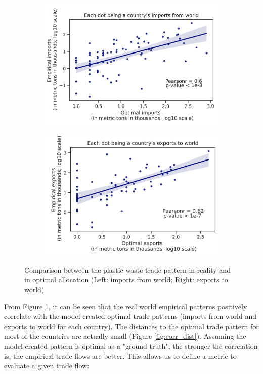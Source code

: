 \documentclass[dvipsnames]{article}
\begin{document}
\begin{figure}[htb!]
	\centering
	\begin{subfigure}{0.48\textwidth}
		\centering
		\includegraphics[width=\textwidth]{EvaluationScore_import.png}	
	\end{subfigure}
	\begin{subfigure}{0.48\textwidth}
		\centering 
		\includegraphics[width=\textwidth]{EvaluationScore_export.png}
	\end{subfigure}
	\caption{\small Comparison between the plastic waste trade pattern in reality and in optimal allocation (Left: imports from world; Right: exports to world)}
	\label{fig:optimal}
\end{figure}

From Figure \ref{fig:optimal}, it can be seen that the real world empirical patterns positively correlate with the model-created optimal trade patterns (imports from world and exports to world for each country). The distances to the optimal trade pattern for most of the countries are actually small (Figure \ref{fig:corr_dist}). Assuming the model-created pattern is optimal as a "ground truth", the stronger the correlation is, the empirical trade flows are better. This allows us to define a metric to evaluate a given trade flow:
\end{document}
